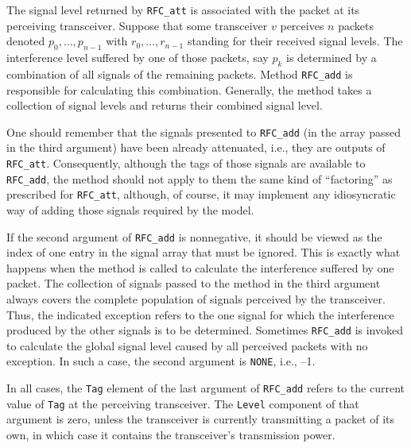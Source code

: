 The signal level returned by {\tt RFC\_att} is associated with the packet
at its perceiving transceiver.
Suppose that some transceiver $v$ perceives $n$ packets denoted
$p_0, \ldots , p_{n-1}$ with $r_0, \ldots , r_{n-1}$ standing for their
received signal levels.
The interference level suffered by one of those packets,
say $p_k$ is determined by 
a combination of all signals of the remaining packets.
Method {\tt RFC\_add} is responsible for calculating this combination.
Generally, the method takes a collection of signal levels and returns
their combined signal level.

One should remember that the signals presented to {\tt RFC\_add} (in
the array passed in the third argument) have been already attenuated,
i.e., they are outputs of {\tt RFC\_att}.
Consequently, although the tags of those signals
are available to {\tt RFC\_add}, the
method should not apply to them the same kind of ``factoring''
as prescribed for {\tt RFC\_att}, although, of course, it may implement any
idiosyncratic way of adding those signals required by the model.

If the second argument of {\tt RFC\_add} is nonnegative, it should be viewed
as the index of one entry in the signal array that must be ignored.
This is exactly what happens when the method is called to calculate the
interference suffered by one packet.
The collection of signals passed to the method in the third argument always
covers the complete population of signals perceived by the transceiver.
Thus, the indicated exception refers to the one signal for which the
interference produced by the other signals is to be determined.
Sometimes {\tt RFC\_add} is invoked to calculate the global signal level
caused by all perceived packets with no exception.
In such a case, the second argument is {\tt NONE}, i.e., --1.

In all cases, the {\tt Tag} element of the last argument of {\tt RFC\_add}
refers to the current value of {\tt Tag} at the perceiving transceiver.
The {\tt Level} component of that argument is zero, unless the transceiver is
currently transmitting a packet of its own, in which case it contains the
transceiver's transmission power.

